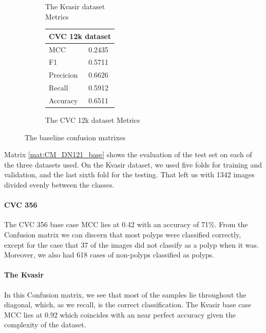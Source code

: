 \begin{figure}[h]
\begin{subfigure}[b]{0.49\textwidth}
\begin{tabular}{ll}
        \bottomrule
\end{tabular}
\caption{The Kvasir dataset\\ Metrics}
\label{tab:kvasir_metrics_DN121_base}
\end{subfigure}%
\begin{subfigure}[b]{0.25\textwidth}
        \begin{tabular}{ll}
        \toprule
        \multicolumn{2}{c}{CVC 12k dataset}        \\
        \midrule
        MCC 		& 0.2435  \\
        F1  		& 0.5711 \\
        Precicion  	& 0.6626 \\
        Recall     	& 0.5912 \\
        Accuracy	& 0.6511 \\
        \bottomrule
        \end{tabular}
\caption{The CVC 12k dataset Metrics}
\label{tab:cvc12k_metrics_DN121_base}
\end{subfigure}
\caption{The baseline confusion matrixes}
\label{fig:results_DN121_base}
\end{figure}


\FloatBarrier
\noindent


Matrix \ref{mat:CM_DN121_base} shows the evaluation of the test set on each of the three datasets used. 
On the Kvasir dataset, we used five folds for training and validation, and the last sixth fold for the testing. That left us with 1342 images divided evenly between the classes. 

\paragraph{CVC 356}
The CVC 356 base case MCC lies at 0.42 with an accuracy of 71\%. 
From the Confusion matrix we can discern that most polyps were classified correctly, except for the case that 37 of the images did not classify as a polyp when it was. Moreover, we also had 618 cases of non-polyps classified as polyps.

\paragraph{The Kvasir}
In this Confusion matrix, we see that most of the samples lie throughout the diagonal, which, as we recall, is the correct classification. 
The Kvasir base case MCC lies at 0.92 which coincides with an near perfect accuracy given the complexity of the dataset.

